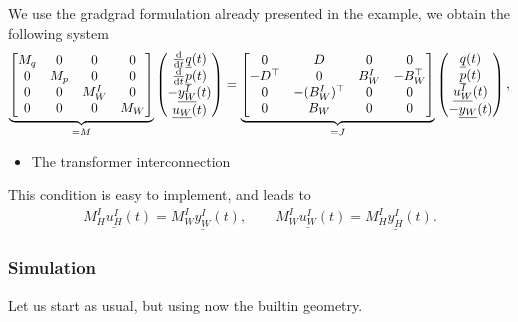 \documentclass[letterpaper,10pt,english]{sphinxmanual}
\begin{document}
\sphinxAtStartPar
We use the grad\sphinxhyphen{}grad formulation already presented in the 
example,  we obtain the following system
\begin{equation*}
\begin{split}\underbrace{\begin{bmatrix}
M_q & 0 & 0 & 0 \\
0 & M_p & 0 & 0 \\
0 & 0 & M^I_W & 0 \\
0 & 0 & 0 & M_W
\end{bmatrix}}_{= M}
\begin{pmatrix}
\frac{\rm d}{{\rm d}t} \underline{q}(t) \\
\frac{\rm d}{{\rm d}t} \underline{p}(t) \\
-\underline{y^I_W}(t) \\
\underline{u_W}(t)
\end{pmatrix}
=
\underbrace{\begin{bmatrix}
0 & D & 0 & 0 \\
-D^\top & 0 & B^I_W & -B_W^\top \\
0 & -(B^I_W)^\top & 0 & 0 \\
0 & B_W & 0 & 0
\end{bmatrix}}_{= J}
\begin{pmatrix}
\underline{q}(t) \\
\underline{p}(t) \\
\underline{u^I_W}(t) \\
-\underline{y_W}(t)
\end{pmatrix},\end{split}
\end{equation*}\begin{itemize}
\item {} 
\sphinxAtStartPar
The transformer interconnection

\end{itemize}

\sphinxAtStartPar
This condition is easy to implement, and leads to
\begin{equation*}
\begin{split}M^I_H \underline{u^I_H}(t) = M^I_W \underline{y^I_W}(t), \qquad M^I_W \underline{u^I_W}(t) = M^I_H \underline{y^I_H}(t).\end{split}
\end{equation*}

\subsubsection{Simulation}
\label{\detokenize{examples/heat_wave:simulation}}
\sphinxAtStartPar
Let us start as usual, but using now the  built\sphinxhyphen{}in
geometry.
\end{document}
